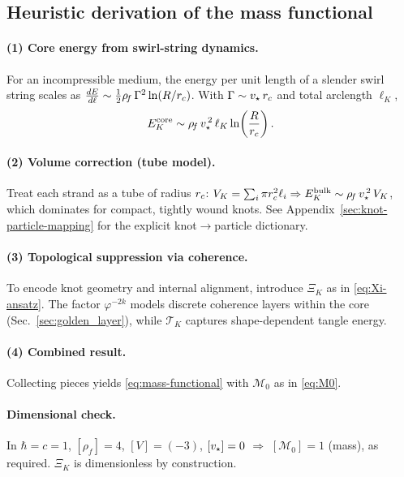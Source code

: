 \documentclass[11pt, preprint,titlepage]{revtex4-2}
\newcommand{\rhoF}{\rho_{\!f}}      %
\begin{document}
	\subsection{Heuristic derivation of the mass functional}

	\paragraph{(1) Core energy from swirl-string dynamics.}
	For an incompressible medium, the energy per unit length of a slender swirl string scales as
	\(
	\tfrac{dE}{d\ell} \sim \tfrac{1}{2}\rhoF\,\Gamma^2 \ln (R/\rc)
	\).
	With \(\Gamma \sim v_\star\,r_c\) and total arclength \(\ell_K\),
	\begin{equation}
		E_K^{\mathrm{core}} \sim \rhoF\,\vstar^{\,2}\,\ell_K \ln\!\left(\frac{R}{\rc}\right).
	\end{equation}

	\paragraph{(2) Volume correction (tube model).}
	Treat each strand as a tube of radius \(r_c\):
	\(
	V_K=\sum_i \pi \rc^2 \ell_i
	\Rightarrow
	E_K^{\mathrm{bulk}} \sim \rhoF\,\vstar^{\,2}\,V_K
	\),
	which dominates for compact, tightly wound knots.
	See Appendix~\ref{sec:knot-particle-mapping} for the explicit knot\(\to\)particle dictionary.

	\paragraph{(3) Topological suppression via coherence.}
	To encode knot geometry and internal alignment, introduce \(\Xi_K\) as in \eqref{eq:Xi-ansatz}. The factor \(\varphi^{-2k}\) models discrete coherence layers within the core (Sec.~\ref{sec:golden_layer}), while \(\mathcal{T}_K\) captures shape-dependent tangle energy.

	\paragraph{(4) Combined result.}
	Collecting pieces yields \eqref{eq:mass-functional} with \(\mathcal{M}_0\) as in \eqref{eq:M0}.

	\paragraph{Dimensional check.}
	In \(\hbar=c=1\), \([\rhoF]=4\), \([V]=(-3)\), \([v_\star]=0\) \(\Rightarrow\) \([\mathcal{M}_0]=1\) (mass), as required. \(\Xi_K\) is dimensionless by construction.
\end{document}
